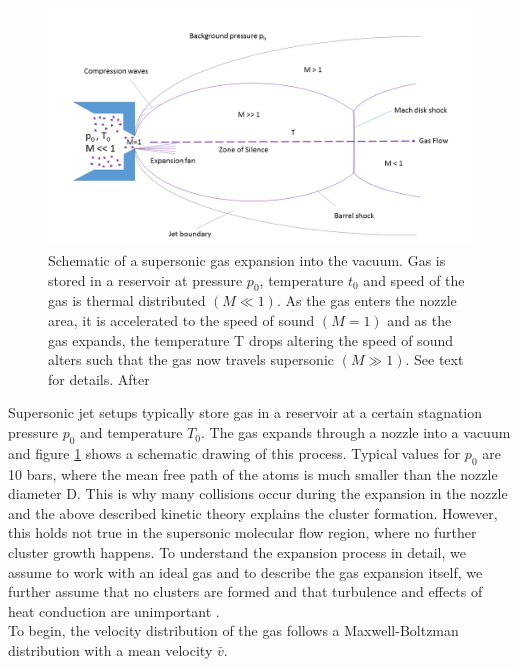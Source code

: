 \begin{figure}
	\centering
		\includegraphics[width=1.00\textwidth]{images/freeJetExpansion.png}
	\caption[Schematic of a supersonic gas expansion into the vacuum.]{Schematic of a supersonic gas expansion into the vacuum. Gas is stored in a reservoir at pressure $p_{0}$, temperature $t_{0}$ and speed of the gas is thermal distributed $\left(M\ll 1\right)$. As the gas enters the nozzle area, it is accelerated to the speed of sound $\left(M=1\right)$ and as the gas expands, the temperature T drops altering the speed of sound alters such that the gas now travels supersonic $\left(M\gg 1\right)$. See text for details. After \citep{Miller-1988-Oxford}}
	\label{fig:freeJetExpansion}
\end{figure}
Supersonic jet setups typically store gas in a reservoir at a certain stagnation pressure $p_{0}$ and temperature $T_{0}$. The gas expands through a nozzle into a vacuum and figure \ref{fig:freeJetExpansion} shows a schematic drawing of this process. Typical values for $p_{0}$ are 10 bars, where the mean free path of the atoms is much smaller than the nozzle diameter D. This is why many collisions occur during the expansion in the nozzle and the above described kinetic theory explains the cluster formation. However, this holds not true in the supersonic molecular flow region, where no further cluster growth happens. To understand the expansion process in detail, we assume to work with an ideal gas and to describe the gas expansion itself, we further assume that no clusters are formed and that turbulence and effects of heat conduction are unimportant \cite{Yamada-2001-SciDir,Haberland-1994-Springer}.\\
To begin, the velocity distribution of the gas follows a Maxwell-Boltzman distribution with a mean velocity $\bar{v}$. %
